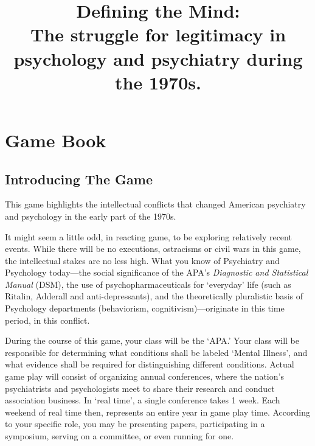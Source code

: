\pagebreak 

\part{Game Book}
\label{gamebook}


\begin{refsection}
\title{Defining the Mind:\protect\\
\large{The struggle for legitimacy in psychology and psychiatry during the 1970s.}}

\maketitle
\newpage





\frontmatter
\tableofcontents
\newpage
\listoftables
\newpage
\listoffigures
\newpage


\mainmatter

\pagebreak 

\chapter{Introducing The Game}
\label{introducingthegame}

This game highlights the intellectual conflicts that changed American psychiatry and psychology in the early part of the 1970s.

It might seem a little odd, in reacting game, to be exploring relatively recent events. While there will be no executions, ostracisms or civil wars in this game, the intellectual stakes are no less high. What you know of Psychiatry and Psychology today---the social significance of the APA's \emph{Diagnostic and Statistical Manual }(DSM), the use of psychopharmaceuticals for `everyday' life (such as Ritalin, Adderall and anti-depressants), and the theoretically pluralistic basis of Psychology departments (behaviorism, cognitivism)---originate in this time period, in this conflict. 

During the course of this game, your class will be the `APA.' Your class will be responsible for determining what conditions shall be labeled `Mental Illness', and what evidence shall be required for distinguishing different conditions. Actual game play will consist of organizing annual conferences, where the nation's psychiatrists and psychologists meet to share their research and conduct association business. In `real time', a single conference takes 1 week. Each weekend of real time then, represents an entire year in game play time. According to your specific role, you may be presenting papers, participating in a symposium, serving on a committee, or even running for one.


\end{refsection}
